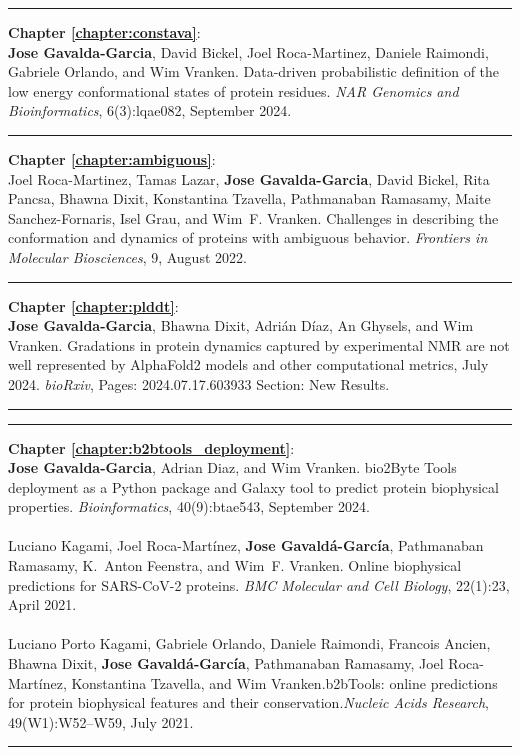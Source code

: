 \hrule
\vspace{0.8 em}
\noindent
\textbf{Chapter \ref{chapter:constava}}:
\\
\textbf{Jose Gavalda-Garcia}, David Bickel, Joel Roca-Martinez, Daniele Raimondi, Gabriele Orlando, and Wim Vranken. Data-driven probabilistic definition of the low energy conformational states of protein residues.
\textit{NAR Genomics and Bioinformatics}, 6(3):lqae082, September 2024. 
\vspace{0.8 em}
\hrule
\vspace{0.8 em}
\noindent
\textbf{Chapter \ref{chapter:ambiguous}}:
\\
Joel Roca-Martinez, Tamas Lazar, \textbf{Jose Gavalda-Garcia}, David Bickel, Rita Pancsa, Bhawna Dixit, Konstantina Tzavella, Pathmanaban Ramasamy, Maite Sanchez-Fornaris, Isel Grau, and Wim~F. Vranken.
Challenges in describing the conformation and dynamics of proteins with ambiguous behavior. \textit{Frontiers in Molecular Biosciences}, 9, August 2022.
\vspace{0.8 em}
\hrule
\vspace{0.8 em}
\noindent
\textbf{Chapter \ref{chapter:plddt}}:
\\
\textbf{Jose Gavalda-Garcia}, Bhawna Dixit, Adrián Díaz, An Ghysels, and Wim Vranken. Gradations in protein dynamics captured by experimental NMR are not well represented by AlphaFold2 models and other computational metrics, July 2024. \textit{bioRxiv}, Pages: 2024.07.17.603933 Section: New Results.
\vspace{0.8 em}
\hrule
\newpage
\hrule
\vspace{0.8 em}
\noindent
\textbf{Chapter \ref{chapter:b2btools_deployment}}:
\\
\textbf{Jose Gavalda-Garcia}, Adrian Diaz, and Wim Vranken. bio2Byte Tools deployment as a Python package and Galaxy tool to predict protein biophysical properties. \textit{Bioinformatics}, 40(9):btae543, September 2024.
\\
\\
Luciano Kagami, Joel Roca-Martínez, \textbf{Jose Gavaldá-García}, Pathmanaban Ramasamy, K.~Anton Feenstra, and Wim~F. Vranken. Online biophysical predictions for {SARS}-{CoV}-2 proteins. \textit{BMC Molecular and Cell Biology}, 22(1):23, April 2021.
\\
\\
Luciano Porto Kagami, Gabriele Orlando, Daniele Raimondi, Francois Ancien, Bhawna Dixit, \textbf{Jose Gavaldá-García}, Pathmanaban Ramasamy, Joel Roca-Martínez, Konstantina Tzavella, and Wim Vranken.{b2bTools}: online predictions for protein biophysical features and their conservation.\textit{Nucleic Acids Research}, 49(W1):W52--W59, July 2021.
\vspace{0.8 em}
\hrule
\vspace{0.8 em}
